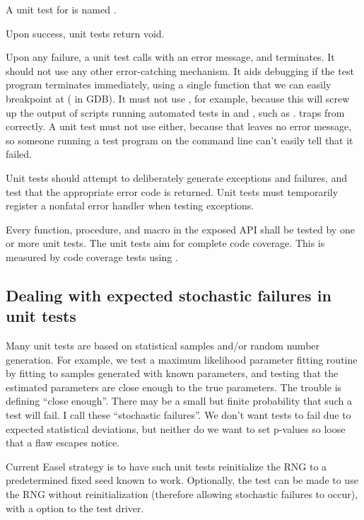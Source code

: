 A unit test for  is named . 

Upon success, unit tests return void.

Upon any failure, a unit test calls  with an error
message, and terminates. It should not use any other error-catching
mechanism. It aids debugging if the test program terminates
immediately, using a single function that we can easily breakpoint at
( in GDB). It must not use ,
for example, because this will screw up the output of scripts running
automated tests in  and , such as
.  traps  from
 correctly. A unit test must not use
 either, because that leaves no error message, so
someone running a test program on the command line can't easily tell
that it failed.

Unit tests should attempt to deliberately generate exceptions and
failures, and test that the appropriate error code is returned.  Unit
tests must temporarily register a nonfatal error handler when testing
exceptions. 

Every function, procedure, and macro in the exposed API shall be
tested by one or more unit tests. The unit tests aim for complete code
coverage. This is measured by code coverage tests using .



\subsection{Dealing with expected stochastic failures in unit tests}

Many unit tests are based on statistical samples and/or random number
generation.  For example, we test a maximum likelihood parameter
fitting routine by fitting to samples generated with known parameters,
and testing that the estimated parameters are close enough to the true
parameters.  The trouble is defining ``close enough''. There may be a
small but finite probability that such a test will fail. I call these
``stochastic failures''.  We don't want tests to fail due to expected
statistical deviations, but neither do we want to set p-values so
loose that a flaw escapes notice.

Current Easel strategy is to have such unit tests reinitialize the RNG
to a predetermined fixed seed known to work. Optionally, the test can
be made to use the RNG without reinitialization (therefore allowing
stochastic failures to occur), with a  option to the test
driver. 

